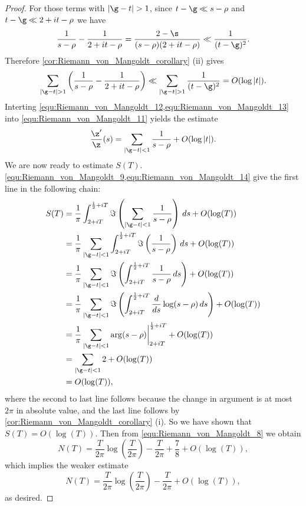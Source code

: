\begin{proof}
        For those terms with $|\g-t| > 1$, since $t-\g \ll s-\rho$ and $t-\g \ll 2+it-\rho$ we have
        \[
          \frac{1}{s-\rho}-\frac{1}{2+it-\rho} = \frac{2-\s}{(s-\rho)(2+it-\rho)} \ll \frac{1}{(t-\g)^{2}}.
        \]
        Therefore \cref{cor:Riemann_von_Mangoldt_corollary} (ii) gives
        \begin{equation}\label{equ:Riemann_von_Mangoldt_13}
          \sum_{|\g-t| > 1}\left(\frac{1}{s-\rho}-\frac{1}{2+it-\rho}\right) \ll \sum_{|\g-t| > 1}\frac{1}{(t-\g)^{2}} = O(\log|t|).
        \end{equation}
        Interting \cref{equ:Riemann_von_Mangoldt_12,equ:Riemann_von_Mangoldt_13} into \cref{equ:Riemann_von_Mangoldt_11} yields the estimate
        \begin{equation}\label{equ:Riemann_von_Mangoldt_14}
          \frac{\z'}{\z}(s) = \sum_{|\g-t| < 1}\frac{1}{s-\rho}+O(\log|t|).
        \end{equation}
        We are now ready to estimate $S(T)$. \cref{equ:Riemann_von_Mangoldt_9,equ:Riemann_von_Mangoldt_14} give the first line in the following chain:
        \begin{align*}
          S(T) &= \frac{1}{\pi}\int_{2+iT}^{\frac{1}{2}+iT}\Im\left(\sum_{|\g-t| < 1}\frac{1}{s-\rho}\right)\,ds+O(\log(T)) \\
          &= \frac{1}{\pi}\sum_{|\g-t| < 1}\int_{2+iT}^{\frac{1}{2}+iT}\Im\left(\frac{1}{s-\rho}\right)\,ds+O(\log(T)) \\
          &= \frac{1}{\pi}\sum_{|\g-t| < 1}\Im\left(\int_{2+iT}^{\frac{1}{2}+iT}\frac{1}{s-\rho}\,ds\right)+O(\log(T)) \\
          &= \frac{1}{\pi}\sum_{|\g-t| < 1}\Im\left(\int_{2+iT}^{\frac{1}{2}+iT}\frac{d}{ds}\log(s-\rho)\,ds\right)+O(\log(T)) \\
          &= \frac{1}{\pi}\sum_{|\g-t| < 1}\arg(s-\rho)\bigg|_{2+iT}^{\frac{1}{2}+iT}+O(\log(T)) \\
          &= \sum_{|\g-t| < 1}2+O(\log(T)) \\
          &= O(\log(T)),
        \end{align*}
        where the second to last line follows because the change in argument is at most $2\pi$ in absolute value, and the last line follows by \cref{cor:Riemann_von_Mangoldt_corollary} (i). So we have shown that $S(T) = O(\log(T))$. Then from \cref{equ:Riemann_von_Mangoldt_8} we obtain
        \[
          N(T) = \frac{T}{2\pi}\log\left(\frac{T}{2\pi}\right)-\frac{T}{2\pi}+\frac{7}{8}+O(\log(T)),
        \]
        which implies the weaker estimate
        \[
          N(T) = \frac{T}{2\pi}\log\left(\frac{T}{2\pi}\right)-\frac{T}{2\pi}+O(\log(T)),
        \]
        as desired.
      \end{proof}

